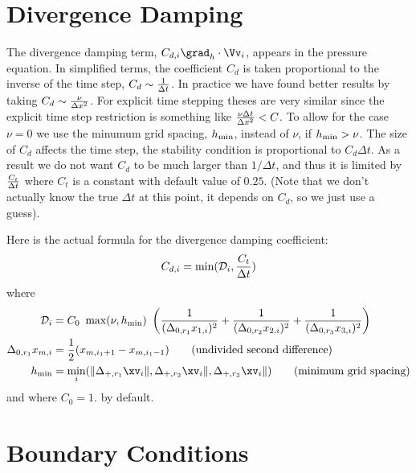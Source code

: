 \documentclass[10pt]{article}
\begin{document}
\clearpage



\clearpage
\section{Divergence Damping} 

The divergence damping term, $C_{d,i} \grad_h\cdot\Vv_i$, appears in the pressure equation.
In simplified terms, the coefficient $C_d$ is taken proportional to the inverse
of the time step, $C_d \sim {1\over \Delta t}$. In practice we have found better results
by taking $C_d \sim {\nu \over \Delta x ^2}$. For explicit time stepping theses are
very similar since the explicit time step restriction is something like ${\nu \Delta t \over\Delta x ^2 }<C$.
To allow for the case $\nu=0$ we use the minumum grid spacing, $h_{\rm min}$,  instead of $\nu$, if
$h_{\rm min} > \nu$.
The size of $C_d$ affects the time step, the stability condition is proportional to $C_d \Delta t$.
As a result we do not want $C_d$ to be much larger than $1/\Delta t$,
and thus it is limited by ${C_t \over \Delta t}$ where $C_t$ is a constant with default value of $0.25$. 
(Note that we don't actually know the true $\Delta t$ at this point, it depends on $C_d$, so we just use a guess).

Here is the actual formula for the divergence damping coefficient:
\[ 
   C_{d,i} = \min( {\cal D}_i , {C_t \over \Delta t} )
\]
where
\begin{align*}
  {\cal D}_i &=   C_0~ \max( \nu, h_{\rm min} ) ~\left(
        {1\over (\Delta_{0,r_1} x_{1,i})^{2}} +
        {1\over (\Delta_{0,r_2} x_{2,i})^{2}} +
        {1\over (\Delta_{0,r_3} x_{3,i})^{2}} \right)   \\
  \Delta_{0,r_1} x_{m,i} &=  {1\over2} ( x_{m,i_1+1} - x_{m,i_1-1} ) \qquad \mbox{(undivided second difference)}\\
  h_{\rm min} &= \min_i ( \| \Delta_{+,r_1} \xv_i \|, \Delta_{+,r_2} \xv_i \|, \Delta_{+,r_3} \xv_i \| ) 
        \qquad \mbox{(minimum grid spacing)} \\
\end{align*}
and where $C_0=1.$ by default.

 


\section{Boundary Conditions}
\end{document}
